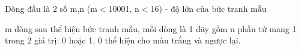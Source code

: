 Dòng đầu là 2 số m,n (m$<$10001, n$<$16) - độ lớn của bức tranh mẫu  

   m dòng sau thể hiện bức tranh mẫu, mỗi dòng là 1 dãy gồm n phần tử mang 1 trong 2 giá trị: 0 hoặc 1, 0 thể hiện cho màu trắng và ngược lại.  

\